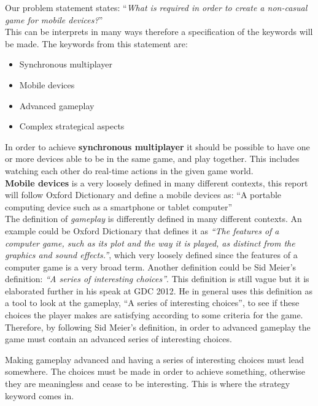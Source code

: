 Our problem statement states: ``\textit{What is required in order to create a non-casual game for mobile devices?}''\\
This can be interprets in many ways therefore a specification of the keywords will be made.
The keywords from this statement are:
\begin{itemize}
\item Synchronous multiplayer
\item Mobile devices
\item Advanced gameplay
\item Complex strategical aspects
\end{itemize}
In order to achieve \textbf{synchronous multiplayer} it should be possible to have one or more devices able to be in the same game, and play together. This includes watching each other do real-time actions in the given game world.\\
\textbf{Mobile devices} is a very loosely defined in many different contexts, this report will follow Oxford Dictionary and define a mobile devices as: ``A portable computing device such as a smartphone or tablet computer''\cite{mobileOx}\\
The definition of \textit{gameplay} is differently defined in many different contexts. An example could be Oxford Dictionary that defines it as \textit{``The features of a computer game, such as its plot and the way it is played, as distinct from the graphics and sound effects.''}\cite{gameplayOx}, which very loosely defined since the features of a computer game is a very broad term. Another definition could be Sid Meier's definition: \textit{``A series of interesting choices''}\cite{GDC2012}. This definition is still vague but it is elaborated further in his speak at GDC 2012.\cite{GDC2012}
He in general uses this definition as a tool to look at the gameplay, ``A series of interesting choices'', to see if these choices the player makes are satisfying according to some criteria for the game.\\
Therefore, by following Sid Meier's definition, in order to advanced gameplay the game must contain an advanced series of interesting choices.

Making gameplay advanced and having a series of interesting choices must lead somewhere.
The choices must be made in order to achieve something, otherwise they are meaningless and cease to be interesting.
This is where the strategy keyword comes in.\\

